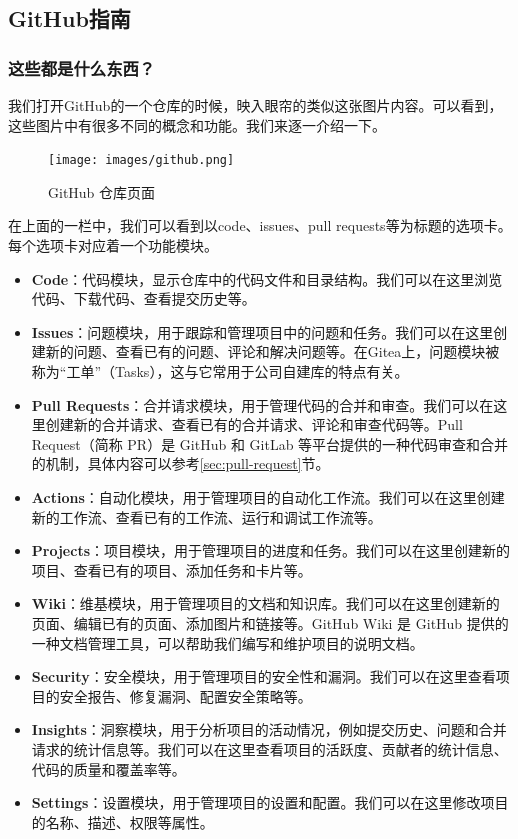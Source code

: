 \documentclass[../main.tex]{subfiles}
\begin{document}
\subsection{GitHub指南}

\subsubsection{这些都是什么东西？}

我们打开GitHub的一个仓库的时候，映入眼帘的类似这张图片内容。可以看到，这些图片中有很多不同的概念和功能。我们来逐一介绍一下。

\begin{figure}[!ht]
  \centering
  \texttt{[image: images/github.png]}
  \caption{GitHub 仓库页面}
  \label{fig:github}
\end{figure}

在上面的一栏中，我们可以看到以code、issues、pull requests等为标题的选项卡。每个选项卡对应着一个功能模块。

\begin{itemize}
  \item \textbf{Code}：代码模块，显示仓库中的代码文件和目录结构。我们可以在这里浏览代码、下载代码、查看提交历史等。
  \item \textbf{Issues}：问题模块，用于跟踪和管理项目中的问题和任务。我们可以在这里创建新的问题、查看已有的问题、评论和解决问题等。在Gitea上，问题模块被称为“工单”（Tasks），这与它常用于公司自建库的特点有关。
  \item \textbf{Pull Requests}：合并请求模块，用于管理代码的合并和审查。我们可以在这里创建新的合并请求、查看已有的合并请求、评论和审查代码等。Pull Request（简称 PR）是 GitHub 和 GitLab 等平台提供的一种代码审查和合并的机制，具体内容可以参考\ref{sec:pull-request}节。
  \item \textbf{Actions}：自动化模块，用于管理项目的自动化工作流。我们可以在这里创建新的工作流、查看已有的工作流、运行和调试工作流等。
  \item \textbf{Projects}：项目模块，用于管理项目的进度和任务。我们可以在这里创建新的项目、查看已有的项目、添加任务和卡片等。
  \item \textbf{Wiki}：维基模块，用于管理项目的文档和知识库。我们可以在这里创建新的页面、编辑已有的页面、添加图片和链接等。GitHub Wiki 是 GitHub 提供的一种文档管理工具，可以帮助我们编写和维护项目的说明文档。
  \item \textbf{Security}：安全模块，用于管理项目的安全性和漏洞。我们可以在这里查看项目的安全报告、修复漏洞、配置安全策略等。
  \item \textbf{Insights}：洞察模块，用于分析项目的活动情况，例如提交历史、问题和合并请求的统计信息等。我们可以在这里查看项目的活跃度、贡献者的统计信息、代码的质量和覆盖率等。
  \item \textbf{Settings}：设置模块，用于管理项目的设置和配置。我们可以在这里修改项目的名称、描述、权限等属性。
\end{itemize}
\end{document}
